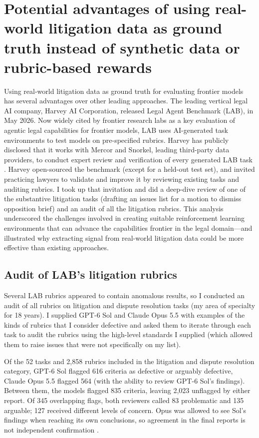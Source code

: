 \documentclass[11pt]{article}
\begin{document}
\section{Potential advantages of using real-world litigation data as ground truth instead of synthetic data or rubric-based rewards}

Using real-world litigation data as ground truth for evaluating frontier models has several advantages over other leading approaches. The leading vertical legal AI company, Harvey AI Corporation, released Legal Agent Benchmark (LAB), in May 2026. Now widely cited by frontier research labs as a key evaluation of agentic legal capabilities for frontier models, LAB uses AI-generated task environments to test models on pre-specified rubrics. Harvey has publicly disclosed that it works with Mercor and Snorkel, leading third-party data providers, to conduct expert review and verification of every generated LAB task \citep{harveyResearchLab}. Harvey open-sourced the benchmark (except for a held-out test set), and invited practicing lawyers to validate and improve it by reviewing existing tasks and auditing rubrics. \citep{harveyLAB} I took up that invitation and did a deep-dive review of one of the substantive litigation tasks (drafting an issues list for a motion to dismiss opposition brief) and an audit of all the litigation rubrics. This analysis underscored the challenges involved in creating suitable reinforcement learning environments that can advance the capabilities frontier in the legal domain---and illustrated why extracting signal from real-world litigation data could be more effective than existing approaches.


\subsection{Audit of LAB's litigation rubrics}

Several LAB rubrics appeared to contain anomalous results, so I conducted an audit of all rubrics on litigation and dispute resolution tasks (my area of specialty for 18 years). I supplied GPT-6 Sol and Claude Opus 5.5 with examples of the kinds of rubrics that I consider defective and asked them to iterate through each task to audit the rubrics using the high-level standards I supplied (which allowed them to raise issues that were not specifically on my list).

Of the 52 tasks and 2,858 rubrics included in the litigation and dispute resolution category, GPT-6 Sol flagged 616 criteria as defective or arguably defective, Claude Opus 5.5 flagged 564 (with the ability to review GPT-6 Sol's findings). Between them, the models flagged 835 criteria, leaving 2,023 unflagged by either report. Of 345 overlapping flags, both reviewers called 83 problematic and 135 arguable; 127 received different levels of concern. Opus was allowed to see Sol's findings when reaching its own conclusions, so agreement in the final reports is not independent confirmation \citep{labaudit}.
\end{document}
